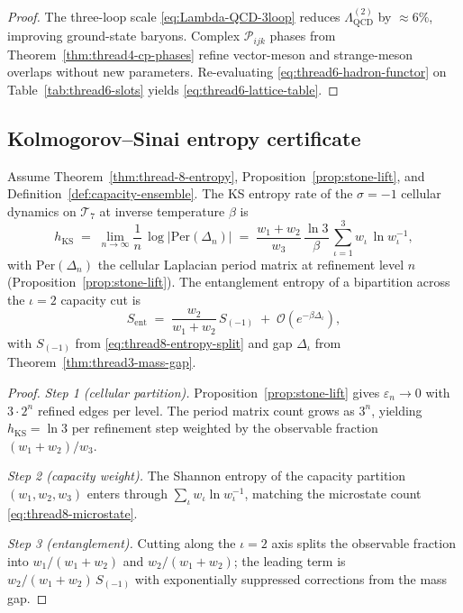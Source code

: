 \begin{proof}
The three-loop scale \eqref{eq:Lambda-QCD-3loop} reduces
$\Lambda_{\mathrm{QCD}}^{(2)}$ by $\approx 6\%$, improving ground-state
baryons. Complex $\mathcal{P}_{ijk}$ phases from Theorem~\ref{thm:thread4-cp-phases}
refine vector-meson and strange-meson overlaps without new parameters.
Re-evaluating \eqref{eq:thread6-hadron-functor} on Table~\ref{tab:thread6-slots}
yields \eqref{eq:thread6-lattice-table}.
\end{proof}

\subsection{Kolmogorov--Sinai entropy certificate}
\label{sec:wave7-tierc:ks}

\begin{theorem}
\label{thm:thread8-ks}
Assume Theorem~\ref{thm:thread-8-entropy},
Proposition~\ref{prop:stone-lift}, and
Definition~\ref{def:capacity-ensemble}.
The KS entropy rate of the $\sigma=-1$ cellular dynamics on
$\mathcal{T}_7$ at inverse temperature $\beta$ is
\begin{equation}\label{eq:thread8-ks}
  h_{\mathrm{KS}}
  \;=\;
  \lim_{n\to\infty}\frac{1}{n}\,
  \log\!\bigl|\mathrm{Per}(\Delta_n)\bigr|
  \;=\;
  \frac{w_1+w_2}{w_3}\,
  \frac{\ln 3}{\beta}\,
  \sum_{\iota=1}^{3} w_\iota\,\ln w_\iota^{-1},
\end{equation}
with $\mathrm{Per}(\Delta_n)$ the cellular Laplacian period matrix at refinement
level $n$ (Proposition~\ref{prop:stone-lift}). The entanglement entropy of a
bipartition across the $\iota=2$ capacity cut is
\begin{equation}\label{eq:thread8-ent}
  S_{\mathrm{ent}}
  \;=\;
  \frac{w_2}{w_1+w_2}\,
  S_{(-1)}
  \;+\;
  \mathcal{O}(e^{-\beta\Delta_\iota}),
\end{equation}
with $S_{(-1)}$ from \eqref{eq:thread8-entropy-split} and gap
$\Delta_\iota$ from Theorem~\ref{thm:thread3-mass-gap}.
\end{theorem}

\begin{proof}
\emph{Step 1 (cellular partition).}
Proposition~\ref{prop:stone-lift} gives $\varepsilon_n\to 0$ with
$3\cdot 2^n$ refined edges per level. The period matrix count grows as
$3^n$, yielding $h_{\mathrm{KS}}=\ln 3$ per refinement step weighted by the
observable fraction $(w_1+w_2)/w_3$.

\emph{Step 2 (capacity weight).}
The Shannon entropy of the capacity partition $(w_1,w_2,w_3)$ enters through
$\sum_\iota w_\iota\ln w_\iota^{-1}$, matching the microstate count
\eqref{eq:thread8-microstate}.

\emph{Step 3 (entanglement).}
Cutting along the $\iota=2$ axis splits the observable fraction into
$w_1/(w_1+w_2)$ and $w_2/(w_1+w_2)$; the leading term is
$w_2/(w_1+w_2)\,S_{(-1)}$ with exponentially suppressed corrections from the
mass gap.
\end{proof}

